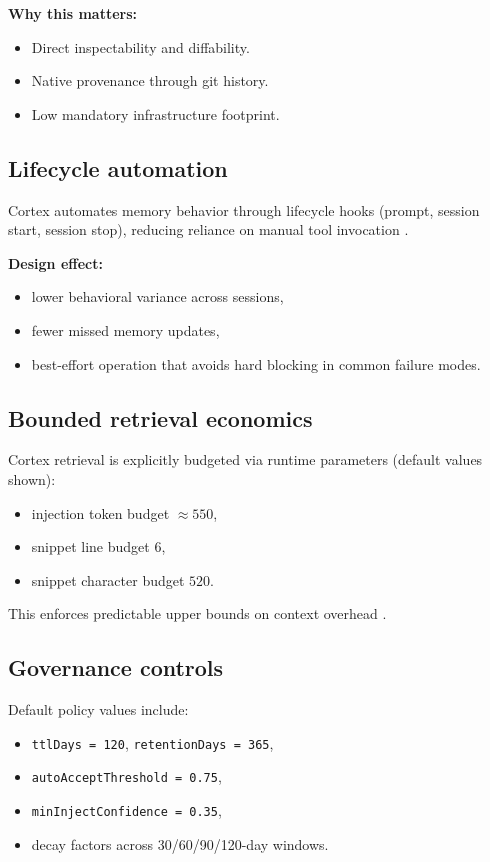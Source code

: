 \documentclass[11pt]{article}
\begin{document}
\textbf{Why this matters:}
\begin{itemize}
  \item Direct inspectability and diffability.
  \item Native provenance through git history.
  \item Low mandatory infrastructure footprint.
\end{itemize}

\subsection{Lifecycle automation}
Cortex automates memory behavior through lifecycle hooks (prompt, session start, session stop), reducing reliance on manual tool invocation \cite{cortex-cli,cortex-hooks}.

\textbf{Design effect:}
\begin{itemize}
  \item lower behavioral variance across sessions,
  \item fewer missed memory updates,
  \item best-effort operation that avoids hard blocking in common failure modes.
\end{itemize}

\subsection{Bounded retrieval economics}
Cortex retrieval is explicitly budgeted via runtime parameters (default values shown):
\begin{itemize}
  \item injection token budget \(\approx 550\),
  \item snippet line budget \(6\),
  \item snippet character budget \(520\).
\end{itemize}

This enforces predictable upper bounds on context overhead \cite{cortex-cli,cortex-index}.

\subsection{Governance controls}
Default policy values include:
\begin{itemize}
  \item \texttt{ttlDays = 120}, \texttt{retentionDays = 365},
  \item \texttt{autoAcceptThreshold = 0.75},
  \item \texttt{minInjectConfidence = 0.35},
  \item decay factors across 30/60/90/120-day windows.
\end{itemize}
\end{document}
